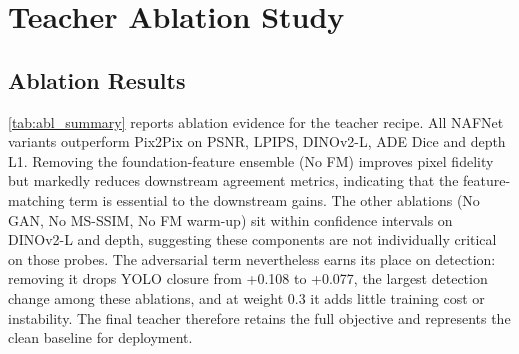 \section{Teacher Ablation Study}
\label{sec:res_ablation}

\subsection{Ablation Results}

\autoref{tab:abl_summary} reports ablation evidence for the teacher recipe. All NAFNet variants outperform Pix2Pix on PSNR, LPIPS, DINOv2-L, ADE Dice and depth L1. Removing the foundation-feature ensemble (No FM) improves pixel fidelity but markedly reduces downstream agreement metrics, indicating that the feature-matching term is essential to the downstream gains. The other ablations (No GAN, No MS-SSIM, No FM warm-up) sit within confidence intervals on DINOv2-L and depth, suggesting these components are not individually critical on those probes. The adversarial term nevertheless earns its place on detection: removing it drops YOLO closure from +0.108 to +0.077, the largest detection change among these ablations, and at weight 0.3 it adds little training cost or instability. The final teacher therefore retains the full objective and represents the clean baseline for deployment.

\begin{table}[!htbp]
\centering
\scriptsize
\setlength{\tabcolsep}{2pt}
\caption{Teacher ablation summary on the canonical held-out test split.}
\label{tab:abl_summary}
\end{table}



